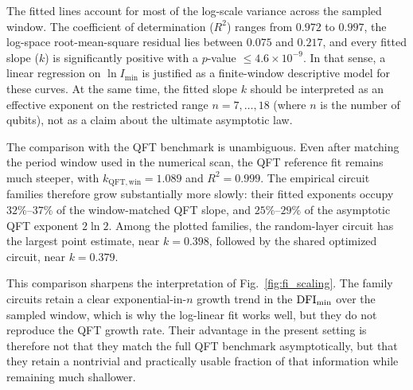 The fitted lines account for most of the log-scale variance across the sampled window. The coefficient of determination ($R^2$) ranges from $0.972$ to $0.997$, the log-space root-mean-square residual lies between $0.075$ and $0.217$, and every fitted slope ($k$) is significantly positive with a $p$-value $\leq 4.6\times 10^{-9}$. In that sense, a linear regression on $\ln I_{\min}$ is justified as a finite-window descriptive model for these curves. At the same time, the fitted slope $k$ should be interpreted as an effective exponent on the restricted range $n=7,\dots,18$ (where $n$ is the number of qubits), not as a claim about the ultimate asymptotic law.

The comparison with the QFT benchmark is unambiguous. Even after matching the period window used in the numerical scan, the QFT reference fit remains much steeper, with $k_{\mathrm{QFT,win}}=1.089$ and $R^2=0.999$. The empirical circuit families therefore grow substantially more slowly: their fitted exponents occupy $32\%$--$37\%$ of the window-matched QFT slope, and $25\%$--$29\%$ of the asymptotic QFT exponent $2\ln 2$. Among the plotted families, the random-layer \myqc{} circuit has the largest point estimate, near $k=0.398$, followed by the shared optimized  circuit, near $k=0.379$.

This comparison sharpens the interpretation of Fig.~\ref{fig:fi_scaling}. The \myqc{} family circuits retain a clear exponential-in-$n$ growth trend in the $\mathrm{DFI}_{\text{min}}$ over the sampled window, which is why the log-linear fit works well, but they do not reproduce the QFT growth rate. Their advantage in the present setting is therefore not that they match the full QFT benchmark asymptotically, but that they retain a nontrivial and practically usable fraction of that information while remaining much shallower.


